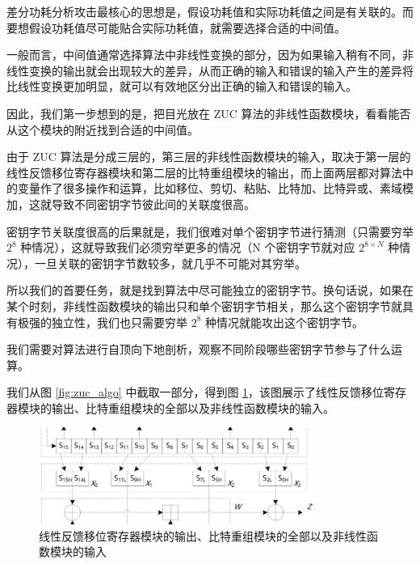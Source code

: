 差分功耗分析攻击最核心的思想是，假设功耗值和实际功耗值之间是有关联的。而要想假设功耗值尽可能贴合实际功耗值，就需要选择合适的中间值。

一般而言，中间值通常选择算法中非线性变换的部分，因为如果输入稍有不同，非线性变换的输出就会出现较大的差异，从而正确的输入和错误的输入产生的差异将比线性变换更加明显，就可以有效地区分出正确的输入和错误的输入。

因此，我们第一步想到的是，把目光放在 ZUC 算法的非线性函数模块，看看能否从这个模块的附近找到合适的中间值。


\vspace*{0.5\baselineskip}

由于 ZUC 算法是分成三层的，第三层的非线性函数模块的输入，取决于第一层的线性反馈移位寄存器模块和第二层的比特重组模块的输出，而上面两层都对算法中的变量作了很多操作和运算，比如移位、剪切、粘贴、比特加、比特异或、素域模加，这就导致不同密钥字节彼此间的关联度很高。

密钥字节关联度很高的后果就是，我们很难对单个密钥字节进行猜测（只需要穷举 $2^8$ 种情况），这就导致我们必须穷举更多的情况（N 个密钥字节就对应 $2^{8 \times N}$ 种情况），一旦关联的密钥字节数较多，就几乎不可能对其穷举。

所以我们的首要任务，就是找到算法中尽可能独立的密钥字节。换句话说，如果在某个时刻，非线性函数模块的输出只和单个密钥字节相关，那么这个密钥字节就具有极强的独立性，我们也只需要穷举 $2^8$ 种情况就能攻出这个密钥字节。

我们需要对算法进行自顶向下地剖析，观察不同阶段哪些密钥字节参与了什么运算。

\vspace*{0.5\baselineskip}

我们从图 \ref{fig:zuc_algo} 中截取一部分，得到图 \ref{fig:zuc_lfsr_br}，该图展示了线性反馈移位寄存器模块的输出、比特重组模块的全部以及非线性函数模块的输入。

\begin{figure}[htbp]
    \centering
    \includegraphics[width=0.8\textwidth]{../images/zuc_lfsr_br.png}
    \caption{线性反馈移位寄存器模块的输出、比特重组模块的全部以及非线性函数模块的输入}
    \label{fig:zuc_lfsr_br}
\end{figure}

